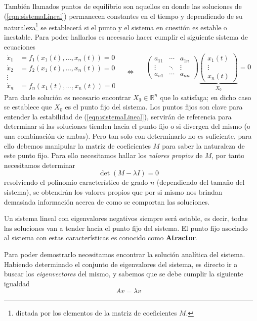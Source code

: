 También llamados puntos de equilibrio son aquellos en donde las soluciones de (\ref{eqn:sistemaLineal}) permanecen constantes en el tiempo y dependiendo de su naturaleza\footnote{dictada por los elementos de la matriz de coeficientes $M$.} se establecerá si el punto y el sistema en cuestión es estable o inestable. Para poder hallarlos es necesario hacer cumplir el siguiente sistema de ecuaciones
\begin{equation*}
	\begin{split}
		\dot{x}_1 &= f_1(x_1(t),...,x_n(t))=0\\
		\dot{x}_2 &= f_2(x_1(t),...,x_n(t))=0\\
		\vdots\\
		\dot{x}_n &= f_n(x_1(t),...,x_n(t))=0
	\end{split}
	\quad\Longleftrightarrow\quad
	\begin{split}
		\begin{pmatrix}
			a_{11} & \cdots & a_{1n}\\
			\vdots & \ddots & \vdots\\
			a_{n1} & \cdots & a_{nn}
		\end{pmatrix}
		\underbrace{\begin{pmatrix}
				x_1(t)\\
				\vdots\\
				x_n(t)
		\end{pmatrix}}_{X_0}=0
	\end{split}
\end{equation*}
Para darle solución es necesario encontrar $X_0\in\mathbb{R}^n$ que lo satisfaga; en dicho caso se establece que $X_0$ es el punto fijo del sistema. Los puntos fijos son clave para entender la estabilidad de (\ref{eqn:sistemaLineal}), servirán de referencia para determinar si las soluciones tienden hacia el punto fijo o si divergen del mismo (o una combinación de ambas). Pero tan solo con determinarlo no es suficiente, para ello debemos manipular la matriz de coeficientes $M$ para saber la naturaleza de este punto fijo. Para ello necesitamos hallar los \textit{valores propios} de $M$, por tanto necesitamos determinar
$$\det(M-\lambda I)=0$$
resolviendo el polinomio característico de grado $n$ (dependiendo del tamaño del sistema), se obtendrán los valores propios que por si mismo nos brindan demasiada información acerca de como se comportan las soluciones.
\begin{proposición}\label{prp:Atractores}
	Un sistema lineal con eigenvalores negativos siempre será estable, es decir, todas las soluciones van a tender hacia el punto fijo del sistema. El punto fijo asociado al sistema con estas características es conocido como \textbf{Atractor}.
\end{proposición}
Para poder demostrarlo necesitamos encontrar la solución analítica del sistema. Habiendo determinado el conjunto de eigenvalores del sistema, es directo ir a buscar los \textit{eigenvectores} del mismo, y sabemos que se debe cumplir la siguiente igualdad
$$Av=\lambda v$$


